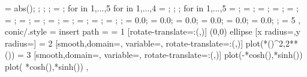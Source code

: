 {{{{{{{              \cs@max = abs(\cs@tangents{\cs@i,\cs@j});
            };
          };
        };
        \cs@max = ;
        for \cs@i in {1,...,5}{
          for \cs@j in {1,...,4}{
            \cs@tangents{\cs@i,\cs@j} = \fpeval{\cs@tangents{\cs@i,\cs@j} / \cs@max};
          };
        };
        for \cs@i in {1,...,5}{
          \cs@u = ;
          \cs@v = ;
          \cs@w = ;
          \cs@temp = ;
          \cs@u = \fpeval{\cs@u / \cs@temp};
          \cs@v = \fpeval{\cs@v / \cs@temp};
          \cs@w = \fpeval{\cs@w / \cs@temp};
           = ;
           = \fpeval{\cs@u*\cs@v};
           = ;
           = \fpeval{\cs@u*\cs@w};
           = \fpeval{\cs@v*\cs@w};
           = ;
        };
         = 0.0;  = 0.0;  = 0.0; 
         = 0.0;  = 0.0;  = 0.0; 
      };
    }
    \ifnum \cs@TanCnt = 5
    \fi
  },
  conic/.style = {
    insert path = {
      \ifnum \cs@type = 1 %
        [rotate-translate={\cs@angle:(\cs@xshift,\cs@yshift)}]
        (0,0) ellipse [x radius=\cs@a,y radius=\cs@b]
      \else\ifnum \cs@type = 2%
        [smooth,domain=,
        variable=\euclidea@var,
        rotate-translate={\cs@angle:(\cs@xshift,\cs@yshift)}]
        plot({\cs@a*(\euclidea@var)^2},{2*\cs@a*(\euclidea@var)}) 
      \else\ifnum \cs@type = 3%
        [smooth,domain=,
        variable=\euclidea@var,
        rotate-translate={\cs@angle:(\cs@xshift,\cs@yshift)}]
        plot({-\cs@a*cosh(\euclidea@var)},{\cs@b*sinh(\euclidea@var)})  %
        plot({ \cs@a*cosh(\euclidea@var)},{\cs@b*sinh(\euclidea@var)})  %
      \fi\fi\fi
    }
  },
}

